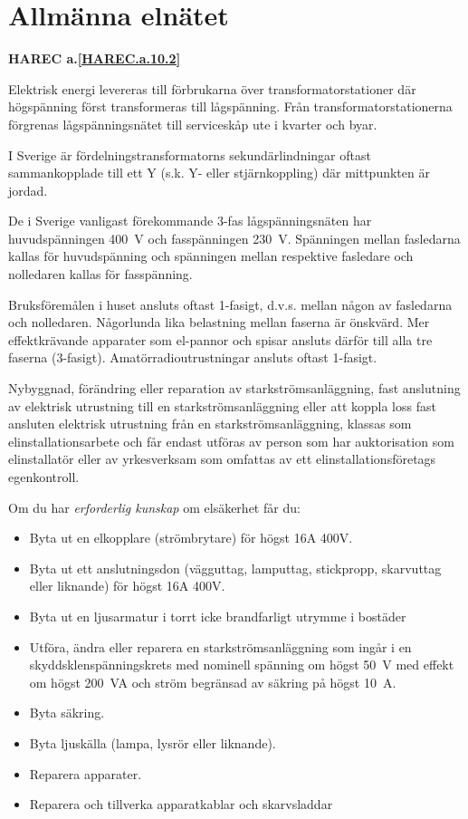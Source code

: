 \section{Allmänna elnätet}
\textbf{
HAREC a.\ref{HAREC.a.10.2}\label{myHAREC.a.10.2}
}
\label{jordning}

Elektrisk energi levereras till förbrukarna över
transformatorstationer där högspänning först transformeras till
lågspänning. Från transformatorstationerna förgrenas lågspänningsnätet
till serviceskåp ute i kvarter och byar.

I Sverige är fördelningstransformatorns sekundärlindningar oftast
sammankopplade till ett Y (s.k. Y- eller stjärnkoppling) där
mittpunkten är jordad.

De i Sverige vanligast förekommande 3-fas lågspänningsnäten har
huvudspänningen 400~V och fasspänningen 230~V. Spänningen mellan fasledarna
kallas för huvudspänning och spänningen mellan respektive fasledare och
nolledaren kallas för fasspänning.

Bruksföremålen i huset ansluts oftast 1-fasigt, d.v.s. mellan någon av
fasledarna och nolledaren. Någorlunda lika belastning mellan faserna är
önskvärd.  Mer effektkrävande apparater som el-pannor och spisar
ansluts därför till alla tre faserna (3-fasigt).
Amatörradioutrustningar ansluts oftast 1-fasigt.

Nybyggnad, förändring eller reparation av starkströmsanläggning,
fast anslutning av elektrisk utrustning till en starkströmsanläggning
eller att koppla loss fast ansluten elektrisk utrustning från en
starkströmsanläggning, klassas som elinstallationsarbete och får endast
utföras av person som har auktorisation som elinstallatör eller av
yrkesverksam som omfattas av ett elinstallationsföretags egenkontroll.

Om du har \emph{erforderlig kunskap} om elsäkerhet får du:
\begin{itemize}
\item Byta ut en elkopplare (strömbrytare) för högst 16A 400V.
\item Byta ut ett anslutningsdon (vägguttag, lamputtag, stickpropp,
skarvuttag eller liknande) för högst 16A 400V.
\item Byta ut en ljusarmatur i torrt icke brandfarligt utrymme i bostäder
\item Utföra, ändra eller reparera en starkströmsanläggning som ingår i en
skyddsklenspänningskrets med nominell spänning om högst 50~V med effekt om
högst 200~VA och ström begränsad av säkring på högst 10~A.
\item Byta säkring.
\item Byta ljuskälla (lampa, lysrör eller liknande).
\item Reparera apparater.
\item Reparera och tillverka apparatkablar och skarvsladdar
\end{itemize}

